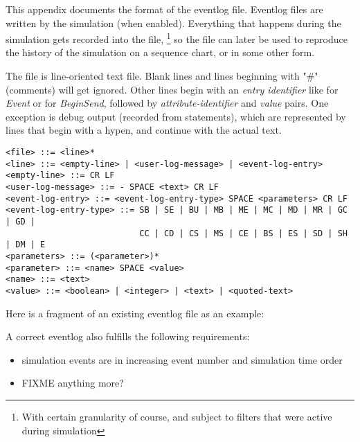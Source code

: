 \label{cha:eventlog-file-format}

This appendix documents the format of the eventlog file. Eventlog
files are written by the simulation (when enabled). Everything
that happens during the simulation gets recorded into the file,
  \footnote{With certain granularity of course, and subject to
  filters that were active during simulation}
so the file can later be used to reproduce the history of the
simulation on a sequence chart, or in some other form.

The file is line-oriented text file. Blank lines and lines beginning
with "\#" (comments) will get ignored. Other lines begin with an
\textit{entry identifier} like  for \textit{Event} or
 for \textit{BeginSend}, followed by \textit{attribute-identifier}
and \textit{value} pairs. One exception is debug output
(recorded from  statements), which are represented
by lines that begin with a hypen, and continue with the actual text.

\begin{verbatim}
<file> ::= <line>*
<line> ::= <empty-line> | <user-log-message> | <event-log-entry>
<empty-line> ::= CR LF
<user-log-message> ::= - SPACE <text> CR LF
<event-log-entry> ::= <event-log-entry-type> SPACE <parameters> CR LF
<event-log-entry-type> ::= SB | SE | BU | MB | ME | MC | MD | MR | GC | GD |
                           CC | CD | CS | MS | CE | BS | ES | SD | SH | DM | E
<parameters> ::= (<parameter>)*
<parameter> ::= <name> SPACE <value>
<name> ::= <text>
<value> ::= <boolean> | <integer> | <text> | <quoted-text>
\end{verbatim}

Here is a fragment of an existing eventlog file as an example:


A correct eventlog also fulfills the following requirements:
\begin{itemize}
   \item simulation events are in increasing event number and simulation time order
   \item FIXME anything more?
\end{itemize}

